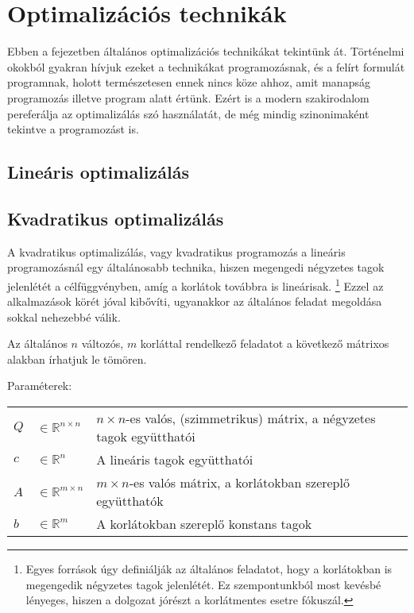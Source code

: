 
\chapter{Optimalizációs technikák}
Ebben a fejezetben általános optimalizációs technikákat tekintünk át. Történelmi okokból gyakran hívjuk ezeket a technikákat programozásnak, és a felírt formulát programnak, holott természetesen ennek nincs köze ahhoz, amit manapság programozás illetve program alatt értünk. Ezért is a modern szakirodalom pereferálja az optimalizálás szó használatát, de még mindig szinonimaként tekintve a programozást is.



\section{Lineáris optimalizálás}


\section{Kvadratikus optimalizálás}

A kvadratikus optimalizálás, vagy kvadratikus programozás a lineáris programozásnál egy általánosabb technika, hiszen megengedi négyzetes tagok jelenlétét a célfüggvényben, amíg a korlátok továbbra is lineárisak. \footnote{Egyes források úgy definiálják az általános feladatot, hogy a korlátokban is megengedik négyzetes tagok jelenlétét. Ez szempontunkból most kevésbé lényeges, hiszen a dolgozat jórészt a korlátmentes esetre fókuszál.} Ezzel az alkalmazások körét jóval kibővíti, ugyanakkor az általános feladat megoldása sokkal nehezebbé válik. 

Az általános $n$ változós, $m$ korláttal rendelkező feladatot a következő mátrixos alakban írhatjuk le tömören.

Paraméterek:

\begin{tabular}{lll}
	$Q$ & $\in \mathbb{R}^{n×n}$  & $n × n$-es valós, (szimmetrikus) mátrix, a négyzetes tagok együtthatói \\
	$c$ & $\in \mathbb{R}^n$   & A lineáris tagok együtthatói \\
	$A$ & $\in \mathbb{R}^{m×n}$  & $m × n$-es valós mátrix, a korlátokban szereplő együtthatók \\
	$b$ & $\in \mathbb{R}^m$   & A korlátokban szereplő konstans tagok \\
\end{tabular}

